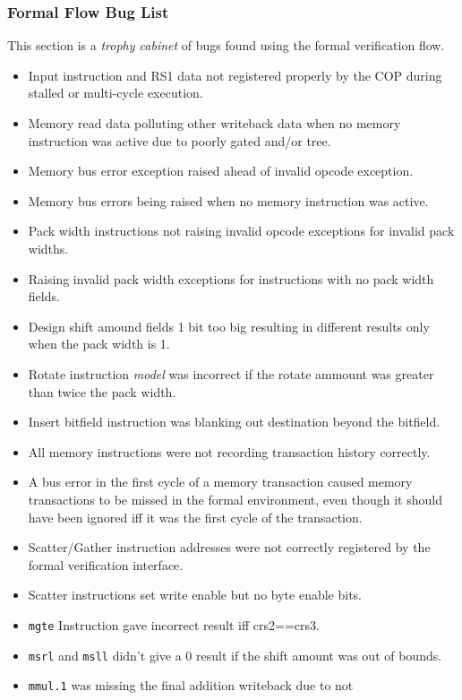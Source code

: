 \subsubsection{Formal Flow Bug List}

This section is a {\em trophy cabinet} of bugs found using the formal
verification flow.

\begin{itemize}
\item Input instruction and RS1 data not registered properly by the COP during
    stalled or multi-cycle execution.
\item Memory read data polluting other writeback data when no memory
    instruction was active due to poorly gated and/or tree.
\item Memory bus error exception raised ahead of invalid opcode exception.
\item Memory bus errors being raised when no memory instruction was active.
\item Pack width instructions not raising invalid opcode exceptions for
    invalid pack widths.
\item Raising invalid pack width exceptions for instructions with no pack
    width fields.
\item Design shift amound fields 1 bit too big resulting in different results
    only when the pack width is 1.
\item Rotate instruction {\em model} was incorrect if the rotate ammount was
    greater than twice the pack width.
\item Insert bitfield instruction was blanking out destination beyond the
    bitfield.
\item All memory instructions were not recording transaction history correctly.
\item A bus error in the first cycle of a memory transaction caused memory
    transactions to be missed in the formal environment, even though it
    should have been ignored iff it was the first cycle of the transaction.
\item Scatter/Gather instruction addresses were not correctly registered
    by the formal verification interface.
\item Scatter instructions set write enable but no byte enable bits.
\item {\tt mgte} Instruction gave incorrect result iff crs2==crs3.
\item {\tt msrl} and {\tt msll} didn't give a 0 result if the shift
    amount was out of bounds.
\item {\tt mmul.1} was missing the final addition writeback due to not

\end{itemize}
